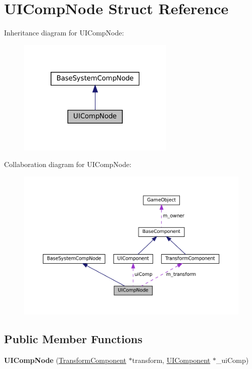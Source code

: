 \hypertarget{structUICompNode}{}\section{U\+I\+Comp\+Node Struct Reference}
\label{structUICompNode}


Inheritance diagram for U\+I\+Comp\+Node\+:\nopagebreak
\begin{figure}[H]
\begin{center}
\leavevmode
\includegraphics[width=211pt]{structUICompNode__inherit__graph}
\end{center}
\end{figure}


Collaboration diagram for U\+I\+Comp\+Node\+:\nopagebreak
\begin{figure}[H]
\begin{center}
\leavevmode
\includegraphics[width=350pt]{structUICompNode__coll__graph}
\end{center}
\end{figure}
\subsection*{Public Member Functions}
\begin{DoxyCompactItemize}
\item 
\mbox{\label{structUICompNode_af2be0cd4fddb312a597d1f96c78431fe}} 
{\bfseries U\+I\+Comp\+Node} (\hyperlink{classTransformComponent}{Transform\+Component} $\ast$transform, \hyperlink{classUIComponent}{U\+I\+Component} $\ast$\+\_\+ui\+Comp)
\end{DoxyCompactItemize}
